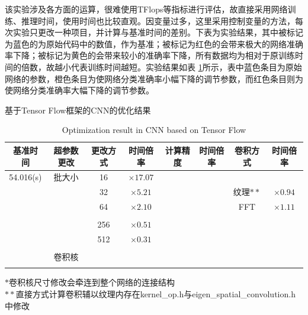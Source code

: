 \par 该实验涉及各方面的运算，很难使用TFlops等指标进行评估，故直接采用网络训练、推理时间，使用时间也比较直观。因变量过多，这里采用控制变量的方法，每次实验只更改一种项目，并计算与基准时间的差别。下表为实验结果，其中被标记为蓝色的为原始代码中的数值，作为基准；被标记为红色的会带来极大的网络准确率下降；被标记为黄色的会带来较小的准确率下降，所有数据均为相对于原训练时间的倍数，故越小代表训练时间越短。实验结果如表 \ref{table-TFRES}所示，表中蓝色条目为原始网络的参数，橙色条目为使网络分类准确率小幅下降的调节参数，而红色条目则为使网络分类准确率大幅下降的调节参数。
\begin{table}
	\centering
	\renewcommand{\thetable}{\arabic{section}-\arabic{table} }
	\renewcommand{\tablename}{表}
	\caption{基于Tensor Flow框架的CNN的优化结果}
	\addtocounter{table}{-1}
	\renewcommand{\thetable}{\arabic{section}-\arabic{table} }
	\renewcommand{\tablename}{Table}
	\caption{Optimization result in CNN based on Tensor Flow}
	\begin{tabular}{cccccccc}
		\toprule
		基准时间 &  超参数更改 &更改方式 &时间倍率 & 计算精度 &时间倍率 & 卷积方式 &时间倍率 	\\
		\midrule
		54.016(s) & 批大小 & 16 & $ \times17.07 $ & \color[rgb]{0.3,0.4,1.0}{FP32} & \color[rgb]{0.3,0.4,1.0}{$ \times 1 $ } & \color[rgb]{0.3,0.4,1.0}{原始(GEMM)} &\color[rgb]{0.3,0.4,1.0}{$ \times 1 $} \\
		 & & 32 & $ \times 5.21 $ & \color[rgb]{0.9,0.7,0.01}{FP16} & \color[rgb]{0.9,0.7,0.01}{$ \times 0.86 $} & 纹理$ ** $ & $ \times 0.94 $\\
		 & & 64 & $ \times 2.10 $ & \color[rgb]{0.9,0.7,0.01}{INT8} & \color[rgb]{0.9,0.7,0.01}{$ \times 0.82 $} & FFT & $ \times 1.11 $\\
		 & & \color[rgb]{0.3,0.4,1.0}{128} & \color[rgb]{0.3,0.4,1.0}{$ \times 1 $}& & & & \\
		 & & 256 & $ \times 0.51 $ & & & & \\
		 & & 512 & $ \times 0.31 $ & & & & \\
		 & & \color[rgb]{0.9,0.7,0.01}{1024} & \color[rgb]{0.9,0.7,0.01}{$ \times 0.21 $}& & & & \\
		 & 卷积核 & \color[rgb]{0.3,0.4,1.0}{$ 5\times 5 $} & \color[rgb]{0.3,0.4,1.0}{$ \times 1 $} & & & & \\
		 & & \color{red}{$ 8\times 8 * $} & \color{red}{$ \times 0.97 $} & & & & \\
		\bottomrule
	\end{tabular} \label{table-TFRES} 
$ * $卷积核尺寸修改会牵连到整个网络的连接结构\\
$ ** $直接方式计算卷积辅以纹理内存在kernel\_op.h与eigen\_spatial\_convolution.h中修改
\end{table}

